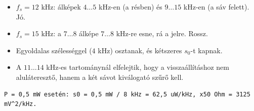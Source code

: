 \begin{center}\end{center}
\begin{eredmeny}

\begin{center}\end{center}

\begin{center}\end{center}
\end{eredmeny}
\begin{tipp}[Ellenőrzés]
\begin{itemize}
\item $f_s=12$ kHz: álképek $4\ldots5$ kHz-en (a résben) és $9\ldots15$ kHz-en (a sáv felett). Jó.
\item $f_s=15$ kHz: a $7\ldots8$ álképe $7\ldots8$ kHz-re esne, rá a jelre. Rossz.
\end{itemize}
\end{tipp}
\begin{figyelem}
\begin{itemize}
\item Egyoldalas szélességgel ($4$ kHz) osztanak, és kétszeres $s_0$-t kapnak.
\item A $11\ldots14$ kHz-es tartománynál elfelejtik, hogy a visszaállításhoz nem aluláteresztő, hanem a két sávot kiválogató szűrő kell.
\end{itemize}
\end{figyelem}
\begin{tipp}
\small
\begin{verbatim}
P = 0,5 mW esetén: s0 = 0,5 mW / 8 kHz = 62,5 uW/kHz, x50 Ohm = 3125 mV^2/kHz.
\end{verbatim}
\end{tipp}


